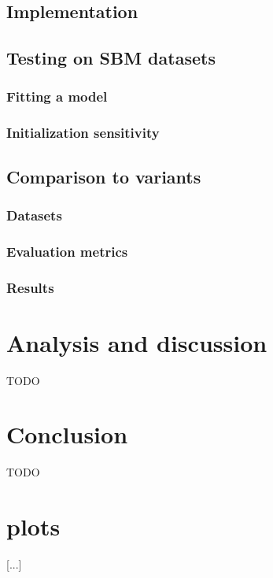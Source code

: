 \documentclass[11pt]{article}
\begin{document}
\subsection{Implementation}


\subsection{Testing on SBM datasets}

\subsubsection{Fitting a model}

\subsubsection{Initialization sensitivity}


\subsection{Comparison to variants}

\subsubsection{Datasets}

\subsubsection{Evaluation metrics}

\subsubsection{Results}


\section{Analysis and discussion}
\label{sec:discussion}

TODO



\section{Conclusion}
\label{sec:conclusion}

TODO




\newpage

\appendix
\section{plots}

 [...]



\end{document}

